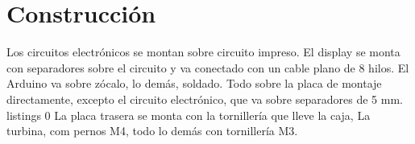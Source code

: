 \section{Construcción}
    Los circuitos electrónicos se montan sobre circuito impreso. El display se monta con separadores sobre el circuito y va conectado con un cable plano de 8 hilos. El Arduino va sobre zócalo, lo demás, soldado. Todo sobre la placa de montaje directamente, excepto el circuito electrónico, que va sobre separadores de 5 mm.\\listings 0
    La placa trasera se monta con la tornillería que lleve la caja, La turbina, com pernos M4, todo lo demás con tornillería M3.